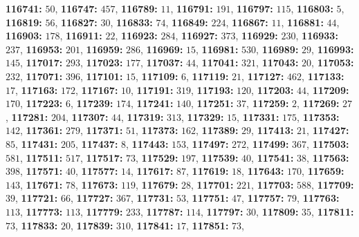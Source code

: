 \textsf{\bfseries 116741:} $50$, \textsf{\bfseries 116747:} $457$, \textsf{\bfseries 116789:} $11$, \textsf{\bfseries 116791:} $191$, \textsf{\bfseries 116797:} $115$, \textsf{\bfseries 116803:} $5$, \textsf{\bfseries 116819:} $56$, \textsf{\bfseries 116827:} $30$, \textsf{\bfseries 116833:} $74$, \textsf{\bfseries 116849:} $224$, \textsf{\bfseries 116867:} $11$, \textsf{\bfseries 116881:} $44$, \textsf{\bfseries 116903:} $178$, \textsf{\bfseries 116911:} $22$, \textsf{\bfseries 116923:} $284$, \textsf{\bfseries 116927:} $373$, \textsf{\bfseries 116929:} $230$, \textsf{\bfseries 116933:} $237$, \textsf{\bfseries 116953:} $201$, \textsf{\bfseries 116959:} $286$, \textsf{\bfseries 116969:} $15$, \textsf{\bfseries 116981:} $530$, \textsf{\bfseries 116989:} $29$, \textsf{\bfseries 116993:} $145$, \textsf{\bfseries 117017:} $293$, \textsf{\bfseries 117023:} $177$, \textsf{\bfseries 117037:} $44$, \textsf{\bfseries 117041:} $321$, \textsf{\bfseries 117043:} $20$, \textsf{\bfseries 117053:} $232$, \textsf{\bfseries 117071:} $396$, \textsf{\bfseries 117101:} $15$, \textsf{\bfseries 117109:} $6$, \textsf{\bfseries 117119:} $21$, \textsf{\bfseries 117127:} $462$, \textsf{\bfseries 117133:} $17$, \textsf{\bfseries 117163:} $172$, \textsf{\bfseries 117167:} $10$, \textsf{\bfseries 117191:} $319$, \textsf{\bfseries 117193:} $120$, \textsf{\bfseries 117203:} $44$, \textsf{\bfseries 117209:} $170$, \textsf{\bfseries 117223:} $6$, \textsf{\bfseries 117239:} $174$, \textsf{\bfseries 117241:} $140$, \textsf{\bfseries 117251:} $37$, \textsf{\bfseries 117259:} $2$, \textsf{\bfseries 117269:} $27$, \textsf{\bfseries 117281:} $204$, \textsf{\bfseries 117307:} $44$, \textsf{\bfseries 117319:} $313$, \textsf{\bfseries 117329:} $15$, \textsf{\bfseries 117331:} $175$, \textsf{\bfseries 117353:} $142$, \textsf{\bfseries 117361:} $279$, \textsf{\bfseries 117371:} $51$, \textsf{\bfseries 117373:} $162$, \textsf{\bfseries 117389:} $29$, \textsf{\bfseries 117413:} $21$, \textsf{\bfseries 117427:} $85$, \textsf{\bfseries 117431:} $205$, \textsf{\bfseries 117437:} $8$, \textsf{\bfseries 117443:} $153$, \textsf{\bfseries 117497:} $272$, \textsf{\bfseries 117499:} $367$, \textsf{\bfseries 117503:} $581$, \textsf{\bfseries 117511:} $517$, \textsf{\bfseries 117517:} $73$, \textsf{\bfseries 117529:} $197$, \textsf{\bfseries 117539:} $40$, \textsf{\bfseries 117541:} $38$, \textsf{\bfseries 117563:} $398$, \textsf{\bfseries 117571:} $40$, \textsf{\bfseries 117577:} $14$, \textsf{\bfseries 117617:} $87$, \textsf{\bfseries 117619:} $18$, \textsf{\bfseries 117643:} $170$, \textsf{\bfseries 117659:} $143$, \textsf{\bfseries 117671:} $78$, \textsf{\bfseries 117673:} $119$, \textsf{\bfseries 117679:} $28$, \textsf{\bfseries 117701:} $221$, \textsf{\bfseries 117703:} $588$, \textsf{\bfseries 117709:} $39$, \textsf{\bfseries 117721:} $66$, \textsf{\bfseries 117727:} $367$, \textsf{\bfseries 117731:} $53$, \textsf{\bfseries 117751:} $47$, \textsf{\bfseries 117757:} $79$, \textsf{\bfseries 117763:} $113$, \textsf{\bfseries 117773:} $113$, \textsf{\bfseries 117779:} $233$, \textsf{\bfseries 117787:} $114$, \textsf{\bfseries 117797:} $30$, \textsf{\bfseries 117809:} $35$, \textsf{\bfseries 117811:} $73$, \textsf{\bfseries 117833:} $20$, \textsf{\bfseries 117839:} $310$, \textsf{\bfseries 117841:} $17$, \textsf{\bfseries 117851:} $73$, 
